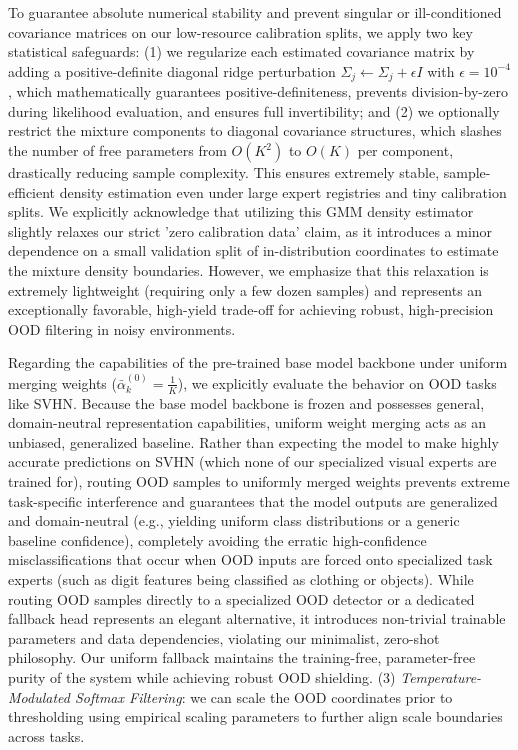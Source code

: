 \begin{itemize}
    To guarantee absolute numerical stability and prevent
    singular or ill-conditioned covariance matrices on our low-resource calibration splits, we apply two key
    statistical safeguards: (1) we regularize each estimated covariance matrix by adding a positive-definite
    diagonal ridge perturbation $\Sigma_j \leftarrow \Sigma_j + \epsilon I$ with $\epsilon = 10^{-4}$,
    which mathematically guarantees positive-definiteness, prevents division-by-zero during likelihood
    evaluation, and ensures full invertibility; and (2) we optionally restrict the mixture components
    to diagonal covariance structures, which slashes the number of free parameters from $O(K^2)$ to $O(K)$
    per component, drastically reducing sample complexity. This ensures extremely stable, sample-efficient
    density estimation even under large expert registries and tiny calibration splits. We explicitly
    acknowledge that utilizing this GMM density estimator slightly relaxes our strict 'zero calibration data'
    claim, as it introduces a minor dependence on a small validation split of in-distribution coordinates
    to estimate the mixture density boundaries. However, we emphasize that this relaxation is extremely
    lightweight (requiring only a few dozen samples) and represents an exceptionally favorable, high-yield
    trade-off for achieving robust, high-precision OOD filtering in noisy environments.

    Regarding the capabilities of the pre-trained base model backbone under uniform merging weights ($\bar{\alpha}_k^{(0)} = \frac{1}{K}$), we explicitly evaluate the behavior on OOD tasks like SVHN. Because the base model backbone is frozen and possesses general, domain-neutral representation capabilities, uniform weight merging acts as an unbiased, generalized baseline. Rather than expecting the model to make highly accurate predictions on SVHN (which none of our specialized visual experts are trained for), routing OOD samples to uniformly merged weights prevents extreme task-specific interference and guarantees that the model outputs are generalized and domain-neutral (e.g., yielding uniform class distributions or a generic baseline confidence), completely avoiding the erratic high-confidence misclassifications that occur when OOD inputs are forced onto specialized task experts (such as digit features being classified as clothing or objects). While routing OOD samples directly to a specialized OOD detector or a dedicated fallback head represents an elegant alternative, it introduces non-trivial trainable parameters and data dependencies, violating our minimalist, zero-shot philosophy. Our uniform fallback maintains the training-free, parameter-free purity of the system while achieving robust OOD shielding.
    (3) \emph{Temperature-Modulated Softmax Filtering}: we can scale the OOD coordinates prior to
    thresholding using empirical scaling parameters to further align scale boundaries across tasks.
\end{itemize}


